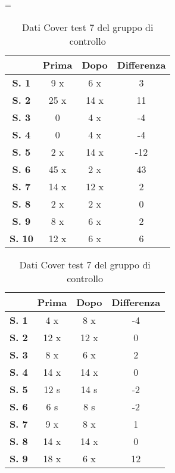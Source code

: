 \begin{table}[H]
\centering
\setlength\tabcolsep{4pt}
\begin{minipage}{0.48\textwidth}
\centering
\tablewidth=\textwidth

\begin{tabular}{|c|c|c|c|} \hline
{\textbf{}} & {\textbf{Prima}} & {\textbf{Dopo}}& {\textbf{Differenza}} \\ \hline
\textbf{S. 1} & 9 x & 6 x & 3 \\ \hline
\textbf{S. 2} & 25 x & 14 x & 11 \\ \hline
\textbf{S. 3} & 0 & 4 x & -4 \\ \hline
\textbf{S. 4} & 0 & 4 x & -4 \\ \hline
\textbf{S. 5} & 2 x & 14 x & -12 \\ \hline
\textbf{S. 6} & 45 x & 2 x & 43 \\ \hline
\textbf{S. 7} & 14 x & 12 x & 2 \\ \hline
\textbf{S. 8} & 2 x & 2 x & 0 \\ \hline
\textbf{S. 9} & 8 x & 6 x & 2 \\ \hline
\textbf{S. 10} & 12 x & 6 x & 6 \\ \hline
\end{tabular} 
\caption{Dati Cover test 7 del gruppo sperimentale}

\label{tab:accuracy} 
\end{minipage}%
\hfill
\begin{minipage}{0.48\textwidth}
\centering

\begin{tabular}{|c|c|c|c|} \hline
{\textbf{}} & {\textbf{Prima}} & {\textbf{Dopo}}& {\textbf{Differenza}} \\ \hline
\textbf{S. 1} & 4 x & 8 x & -4 \\ \hline
\textbf{S. 2} & 12 x & 12 x & 0 \\ \hline
\textbf{S. 3} & 8 x & 6 x & 2 \\ \hline
\textbf{S. 4} & 14 x & 14 x & 0 \\ \hline
\textbf{S. 5} & 12 s & 14 s & -2 \\ \hline
\textbf{S. 6} & 6 s  & 8 s  & -2 \\ \hline
\textbf{S. 7} & 9 x & 8 x & 1 \\ \hline
\textbf{S. 8} & 14 x & 14 x & 0 \\ \hline
\textbf{S. 9} & 18 x & 6 x & 12 \\ \hline
\end{tabular} 
\caption{Dati Cover test 7 del gruppo di controllo}

 \label{tab:ompdiff} 
\end{minipage}
\end{table}
